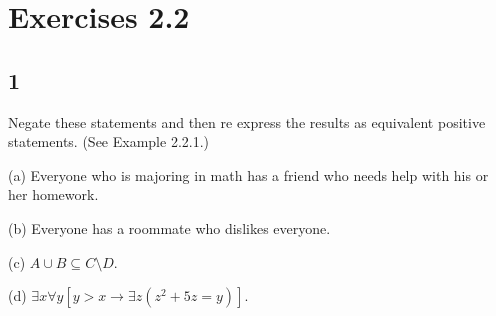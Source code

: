 \documentclass{article}
\begin{document}
\section{Exercises 2.2}
\subsection{1}
Negate these statements and then re express the results as equivalent
positive statements. (See Example 2.2.1.)

(a) Everyone who is majoring in math has a friend who needs help with
his or her homework.

(b) Everyone has a roommate who dislikes everyone.

(c) $A \cup B \subseteq C \setminus D$.

(d) $\exists x\forall y[y > x \rightarrow \exists z(z^2+ 5z = y)]$.
\end{document}
